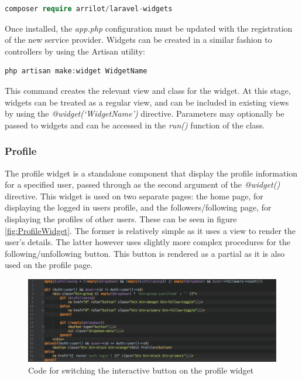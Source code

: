 \begin{lstlisting}[language=php]
 composer require arrilot/laravel-widgets
\end{lstlisting}

Once installed, the \textit{app.php} configuration must be updated with the registration of the new service provider. Widgets can be created in a similar fashion to controllers by using the Artisan utility:

\begin{lstlisting}[language=php]
 php artisan make:widget WidgetName
\end{lstlisting}

This command creates the relevant view and class for the widget. At this stage, widgets can be treated as a regular view, and can be included in existing views by using the \textit{@widget(`WidgetName')} directive. Parameters may optionally be passed to widgets and can be accessed in the \textit{run()} function of the class.

\subsubsection{Profile}
The profile widget is a standalone component that display the profile information for a specified user, passed through as the second argument of the \textit{@widget()} directive. This widget is used on two separate pages: the home page, for displaying the logged in users profile, and the followers/following page, for displaying the profiles of other users. These can be seen in figure \ref{fig:ProfileWidget}. The former is relatively simple as it uses a view to render the user's details. The latter however uses slightly more complex procedures for the following/unfollowing button. This button is rendered as a partial as it is also used on the profile page.

\begin{figure}[H]
	\centering
	\includegraphics[width=\textwidth]{Images/Implementation/UI/Widgets/Profile_Follow}
	\caption{Code for switching the interactive button on the profile widget}
	\label{fig:Profile_Follow}
\end{figure}

